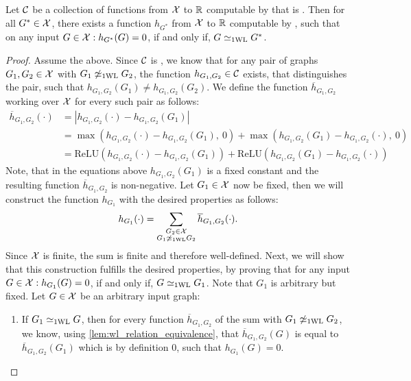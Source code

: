 \begin{lemma}\label{lem:encoding-indicator-func1}
    Let $\mathcal{C}$ be a collection of functions from $\mathcal{X}$ to $\mathbb{R}$ computable by \wlnn that is \wldisc. Then for all $G^* \in \mathcal{X}$, there exists a function $h_{G^*}$ from $\mathcal{X}$ to $\mathbb{R}$ computable by \wlnn, such that on any input $G \in \mathcal{X}: h_{G^*}(G) = 0$, if and only if, $G \simeq_{\text{1WL}} G^*$.
\end{lemma}

\begin{proof}
    Assume the above. Since $\mathcal{C}$ is \wldisc, we know that for any pair of graphs $G_1, G_2 \in \mathcal{X}$ with $G_1 \not\simeq_{\text{1WL}} G_2$, the function $h_{G_1, G_2} \in \mathcal{C}$ exists, that distinguishes the pair, such that $h_{G_1, G_2}(G_1) \neq h_{G_1, G_2}(G_2)$. We define the function $\overline{h}_{G_1,G_2}$ working over $\mathcal{X}$ for every such pair as follows:
    \begin{align}\label{eq:lemma_inidcator_function_1}
        \overline{h}_{G_1, G_2}(\cdot) &= |h_{G_1, G_2}(\cdot) - h_{G_1, G_2}(G_1)| \nonumber\\
        &= \max(h_{G_1, G_2}(\cdot) - h_{G_1, G_2}(G_1), \ 0) + \max(h_{G_1, G_2}(G_1) - h_{G_1, G_2}(\cdot), \ 0) \nonumber\\
        &= \text{ReLU}(h_{G_1, G_2}(\cdot) - h_{G_1, G_2}(G_1)) + \text{ReLU}(h_{G_1, G_2}(G_1) - h_{G_1, G_2}(\cdot))
    \end{align}
    Note, that in the equations above $h_{G_1, G_2}(G_1)$ is a fixed constant and the resulting function $\overline{h}_{G_1, G_2}$ is non-negative.
    Let $G_1 \in \mathcal{X}$ now be fixed, then we will construct the function $h_{G_1}$ with the desired properties as follows:
    \begin{align}\label{eq:lemma_inidcator_function_2}
        h_{G_1}(\cdot) = \sum_{\substack{G_2 \in \mathcal{X} \\ G_1 \not\simeq_{\text{1WL}} G_2}} \overline{h}_{G_1, G_2}(\cdot).
    \end{align}
    Since $\mathcal{X}$ is finite, the sum is finite and therefore well-defined. Next, we will show that this construction fulfills the desired properties, by proving that for any input $G \in \mathcal{X}: h_{G_1}(G) = 0$, if and only if, $G \simeq_{\text{1WL}} G_1$. Note that $G_1$ is arbitrary but fixed. Let $G \in \mathcal{X}$ be an arbitrary input graph:
    \begin{enumerate}
        \item If $G_1 \simeq_{\text{1WL}} G$, then for every function $\overline{h}_{G_1, G_2}$ of the sum with $G_1 \not\simeq_{\text{1WL}} G_2$, we know, using \cref{lem:wl_relation_equivalence}, that $\overline{h}_{G_1, G_2}(G)$ is equal to $\overline{h}_{G_1, G_2}(G_1)$ which is by definition $0$, such that $h_{G_1}(G) = 0$.

\end{enumerate}
\end{proof}
